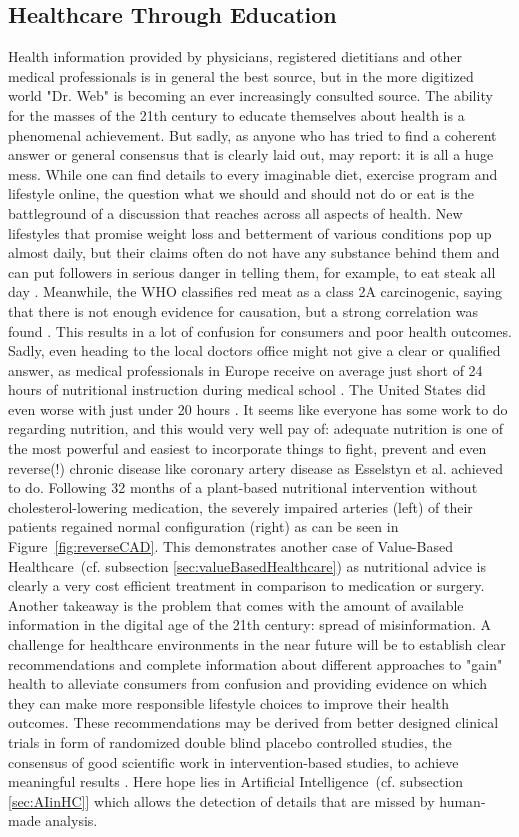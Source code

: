 \subsection{Healthcare Through Education}
Health information provided by physicians, registered dietitians and other medical professionals is in general the best source, but in the more digitized world "Dr. Web" is becoming an ever increasingly consulted source. The ability for the masses of the 21th century to educate themselves about health is a phenomenal achievement. But sadly, as anyone who has tried to find a coherent answer or general consensus that is clearly laid out, may report: it is all a huge mess. While one can find details to every imaginable diet, exercise program and lifestyle online, the question what we should and should not do or eat is the battleground of a discussion that reaches across all aspects of health. New lifestyles that promise weight loss and betterment of various conditions pop up almost daily, but their claims often do not have any substance behind them and can put followers in serious danger in telling them, for example, to eat steak all day \cite{carnivoreDiet}. Meanwhile, the WHO classifies red meat as a class 2A carcinogenic, saying that there is not enough evidence for causation, but a strong correlation was found \cite{whoRedMeat}. This results in a lot of confusion for consumers and poor health outcomes. Sadly, even heading to the local doctors office might not give a clear or qualified answer, as medical professionals in Europe receive on average just short of 24 hours of nutritional instruction during medical school \cite{chung2014nutrition}. The United States did even worse with just under 20 hours \cite{adams2010nutrition}. It seems like everyone has some work to do regarding nutrition, and this would very well pay of: adequate nutrition is one of the most powerful and easiest to incorporate things to fight, prevent and even reverse(!) chronic disease like coronary artery disease as Esselstyn et al. achieved to do. Following 32 months of a plant-based nutritional intervention without cholesterol-lowering medication, the severely impaired arteries (left) of their patients regained normal configuration (right) as can be seen in Figure~\ref{fig:reverseCAD}.
This demonstrates another case of Value-Based Healthcare~(cf. subsection \ref{sec:valueBasedHealthcare}) as nutritional advice is clearly a very cost efficient treatment in comparison to medication or surgery. Another takeaway is the problem that comes with the amount of available information in the digital age of the 21th century: spread of misinformation. A challenge for healthcare environments in the near future will be to establish clear recommendations and complete information about different approaches to "gain" health to alleviate consumers from confusion and providing evidence on which they can make more responsible lifestyle choices to improve their health outcomes. These recommendations may be derived from better designed clinical trials in form of randomized double blind placebo controlled studies, the consensus of good scientific work in intervention-based studies, to achieve meaningful results \cite{misra2012randomized}. Here hope lies in Artificial Intelligence~(cf. subsection \ref{sec:AIinHC}] which allows the detection of details that are missed by human-made analysis.
